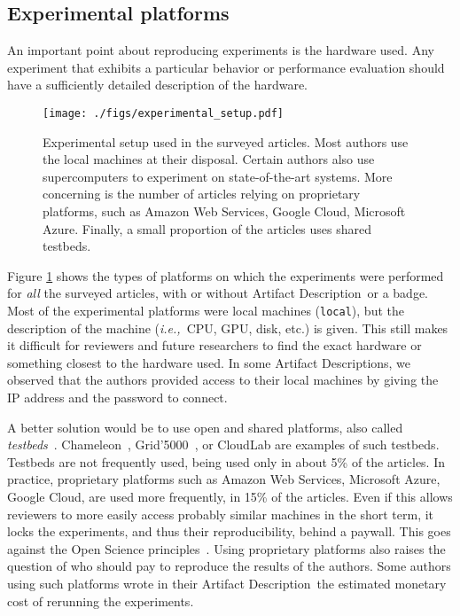 \documentclass[sigconf,natbib=false]{acmart}
\newcommand{\ie}{\emph{i.e.,}}
\newcommand{\ad}{Artifact Description}
\begin{document}
\subsection{Experimental platforms}\label{sec:sop:expe}

An important point about reproducing experiments is the hardware used.
Any experiment that exhibits a particular behavior or performance evaluation should have a sufficiently detailed description of the hardware. 

\begin{figure}
  \centering
  \texttt{[image: ./figs/experimental\_setup.pdf]}
  \caption{Experimental setup used in the surveyed articles.
  Most authors use the local machines at their disposal.
  Certain authors also use supercomputers to experiment on state-of-the-art systems.
  More concerning is the number of articles relying on proprietary platforms, such as Amazon Web Services, Google Cloud, Microsoft Azure.
  Finally, a small proportion of the articles uses shared testbeds.
  }
  \label{fig:experimental_setup}
\end{figure}

Figure \ref{fig:experimental_setup} shows the types of platforms on which the experiments were performed for \emph{all} the surveyed articles, with or without \ad\ or a badge.
Most of the experimental platforms were local machines (\texttt{local}), but the description of the machine (\ie\ CPU, GPU, disk, etc.) is given.
This still makes it difficult for reviewers and future researchers to find the exact hardware or something closest to the hardware used.
In some \ad s, we observed that the authors provided access to their local machines by giving the IP address and the password to connect.

A better solution would be to use open and shared platforms, also called \emph{testbeds}\ \cite{nussbaum2017testbeds}.
Chameleon\ \cite{chameleon}, Grid'5000\ \cite{grid5000}, or CloudLab \cite{cloudlab} are examples of such testbeds.
Testbeds are not frequently used, being used only in about 5\% of the articles.
In practice, proprietary platforms such as Amazon Web Services, Microsoft Azure, Google Cloud, are used more frequently, in 15\% of the articles.
Even if this allows reviewers to more easily access probably similar machines in the short term, it locks the experiments, and thus their reproducibility, behind a paywall.
This goes against the Open Science principles\ \cite{openscience_unesco}.
Using proprietary platforms also raises the question of who should pay to reproduce the results of the authors.
Some authors using such platforms wrote in their \ad\ the estimated monetary cost of rerunning the experiments.
\end{document}
